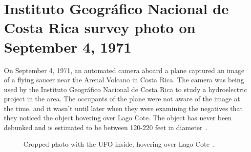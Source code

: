 \section{Instituto Geogr\'afico Nacional de Costa Rica survey photo on September 4, 1971}
\label{2023-UFO-part-History-photos-1971-cr}

On September 4, 1971, an automated camera aboard a plane captured an image of a flying saucer near the Arenal Volcano in Costa Rica.
The camera was being used by the Instituto Geogr\'afico Nacional de Costa Rica to study a hydroelectric project in the area.
The occupants of the plane were not aware of the image at the time, and it wasn't until later when they were
examining the negatives that they noticed the object hovering over  Lago Cote.
The object has never been debunked and is estimated to be between 120-220 feet in diameter~\cite{Adams2022May}.

%
\begin{figure}[b]
\sidecaption
%
%
\caption{Cropped photo with the UFO inside, hovering over  Lago Cote~\cite{Adams2022May}.}

\label{2023-UFO-part-History-photos-1971-cr-cr-c}       %
\end{figure}

